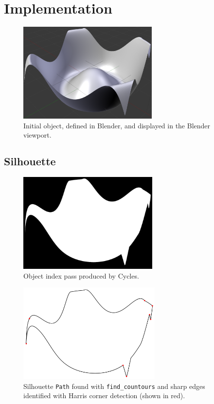 \chapter{Implementation}\label{appendix_implementation}
\begin{figure}[h!]
	\centering
	\includegraphics[height=5cm]{images/sil_viewport.png}
	\caption{Initial object, defined in Blender, and displayed in the Blender viewport.}\label{sil_viewport}
\end{figure}

\FloatBarrier
\section{Silhouette}\label{impl_silhouette}
\begin{figure}[h!]
	\centering
	\includegraphics[height=5cm]{images/sil_obj.png}
	\caption{Object index pass produced by Cycles.}\label{sil_obj}
\end{figure}

\begin{figure}[h!]
	\centering
	\includegraphics[height=5cm]{images/sil_path_corners.png}
	\caption{Silhouette \texttt{Path} found with \texttt{find\_countours} and sharp edges identified with Harris corner detection (shown in red).}\label{sil_path_corners}
\end{figure}

